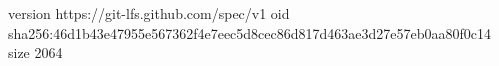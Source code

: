 version https://git-lfs.github.com/spec/v1
oid sha256:46d1b43e47955e567362f4e7eec5d8cec86d817d463ae3d27e57eb0aa80f0c14
size 2064
